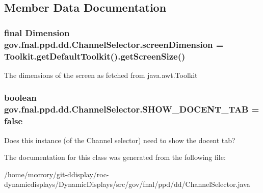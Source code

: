 \subsection{Member Data Documentation}
\hypertarget{classgov_1_1fnal_1_1ppd_1_1dd_1_1ChannelSelector_a78f6040f260da659faca3b09d0617e7e}{
\subsubsection[{screen\-Dimension}]{\setlength{\rightskip}{0pt plus 5cm}final Dimension gov.\-fnal.\-ppd.\-dd.\-Channel\-Selector.\-screen\-Dimension = Toolkit.\-get\-Default\-Toolkit().get\-Screen\-Size()\hspace{0.3cm}{\ttfamily [static]}}}\label{classgov_1_1fnal_1_1ppd_1_1dd_1_1ChannelSelector_a78f6040f260da659faca3b09d0617e7e}
The dimensions of the screen as fetched from java.\-awt.\-Toolkit \hypertarget{classgov_1_1fnal_1_1ppd_1_1dd_1_1ChannelSelector_ad9e88d31f70467252e90a59943338df0}{
\subsubsection[{S\-H\-O\-W\-\_\-\-D\-O\-C\-E\-N\-T\-\_\-\-T\-A\-B}]{\setlength{\rightskip}{0pt plus 5cm}boolean gov.\-fnal.\-ppd.\-dd.\-Channel\-Selector.\-S\-H\-O\-W\-\_\-\-D\-O\-C\-E\-N\-T\-\_\-\-T\-A\-B = false\hspace{0.3cm}{\ttfamily [static]}}}\label{classgov_1_1fnal_1_1ppd_1_1dd_1_1ChannelSelector_ad9e88d31f70467252e90a59943338df0}
Does this instance (of the Channel selector) need to show the docent tab? 

The documentation for this class was generated from the following file\-:\begin{DoxyCompactItemize}
\item 
/home/mccrory/git-\/ddisplay/roc-\/dynamicdisplays/\-Dynamic\-Displays/src/gov/fnal/ppd/dd/Channel\-Selector.\-java\end{DoxyCompactItemize}
